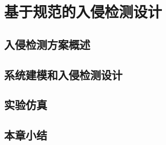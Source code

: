 
\chapter{基于规范的入侵检测设计}
\label{chap:spec detection}

\section{入侵检测方案概述}
\label{sec:list}



\section{系统建模和入侵检测设计}
\label{sec:matheq}


\section{实验仿真}
\label{sec:insertimage}

\section{本章小结}
\label{sec:insertimage}


